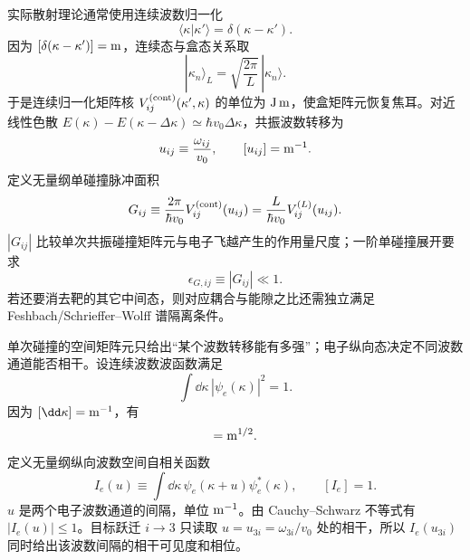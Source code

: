 实际散射理论通常使用连续波数归一化
\begin{equation*}
\langle \kappa|\kappa'\rangle=\delta(\kappa-\kappa').
\end{equation*}
因为 $[\delta(\kappa-\kappa')]={\rm m}$，连续态与盒态关系取
\begin{equation*}
|\kappa_n\rangle_L
=\sqrt{\frac{2\pi}{L}}\,|\kappa_n\rangle.
\end{equation*}
于是连续归一化矩阵核 $V_{ij}^{({\rm cont})}(\kappa',\kappa)$ 的单位为 ${\rm J\,m}$，使盒矩阵元恢复焦耳。对近线性色散 $E(\kappa)-E(\kappa-\Delta\kappa)\simeq\hbar v_0\Delta\kappa$，共振波数转移为
\begin{equation*}
u_{ij}\equiv\frac{\omega_{ij}}{v_0},
\qquad [u_{ij}]={\rm m^{-1}}.
\end{equation*}
定义无量纲单碰撞脉冲面积
\begin{equation*}
G_{ij}
\equiv
\frac{2\pi}{\hbar v_0}
 V_{ij}^{({\rm cont})}(u_{ij})
=\frac{L}{\hbar v_0}
 V_{ij}^{(L)}(u_{ij}).
\end{equation*}
$|G_{ij}|$ 比较单次共振碰撞矩阵元与电子飞越产生的作用量尺度；一阶单碰撞展开要求
\begin{equation*}
\epsilon_{G,ij}\equiv|G_{ij}|\ll1.
\end{equation*}
若还要消去靶的其它中间态，则对应耦合与能隙之比还需独立满足 Feshbach/Schrieffer--Wolff 谱隔离条件。

单次碰撞的空间矩阵元只给出“某个波数转移能有多强”；电子纵向态决定不同波数通道能否相干。设连续波数波函数满足
\begin{equation*}
\int\dd \kappa\,|\psi_e(\kappa)|^2=1.
\end{equation*}
因为 $[\dd \kappa]={\rm m^{-1}}$，有
\begin{equation*}
[\psi_e(\kappa)]={\rm m^{1/2}}.
\end{equation*}
定义无量纲纵向波数空间自相关函数
\begin{equation*}
I_e(u)
\equiv\int\dd \kappa\,
\psi_e(\kappa+u)\psi_e^*(\kappa),
\qquad
[I_e]=1.
\end{equation*}
$u$ 是两个电子波数通道的间隔，单位 ${\rm m^{-1}}$。由 Cauchy--Schwarz 不等式有 $|I_e(u)|\le1$。目标跃迁 $i\to3$ 只读取 $u=u_{3i}=\omega_{3i}/v_0$ 处的相干，所以 $I_e(u_{3i})$ 同时给出该波数间隔的相干可见度和相位。

